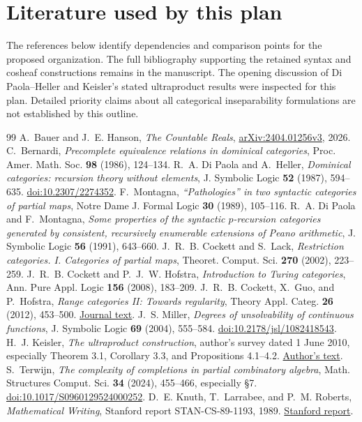 \documentclass[11pt]{article}
\theoremstyle{definition}\newtheorem{definition}[theorem]{Definition}
\begin{document}
\section*{Literature used by this plan}
The references below identify dependencies and comparison points for
the proposed organization. The full bibliography supporting the
retained syntax and cosheaf constructions remains in the manuscript.
The opening discussion of Di Paola--Heller and Keisler's stated
ultraproduct results were inspected for this plan. Detailed priority
claims about all categorical inseparability formulations are not
established by this outline.
\begin{thebibliography}{99}\small
{} A.~Bauer and J.~E. Hanson, \emph{The Countable Reals}, \href{https://arxiv.org/abs/2404.01256v3}{arXiv:2404.01256v3}, 2026.
 C.~Bernardi, \emph{Precomplete equivalence relations in dominical categories}, Proc. Amer. Math. Soc. \textbf{98} (1986), 124--134.
 R.~A. Di Paola and A.~Heller, \emph{Dominical categories: recursion theory without elements}, J. Symbolic Logic \textbf{52} (1987), 594--635. \href{https://doi.org/10.2307/2274352}{doi:10.2307/2274352}.
 F.~Montagna, \emph{``Pathologies'' in two syntactic categories of partial maps}, Notre Dame J. Formal Logic \textbf{30} (1989), 105--116.
 R.~A. Di Paola and F.~Montagna, \emph{Some properties of the syntactic $p$-recursion categories generated by consistent, recursively enumerable extensions of Peano arithmetic}, J. Symbolic Logic \textbf{56} (1991), 643--660.
 J.~R.~B. Cockett and S.~Lack, \emph{Restriction categories. I. Categories of partial maps}, Theoret. Comput. Sci. \textbf{270} (2002), 223--259.
 J.~R.~B. Cockett and P.~J.~W. Hofstra, \emph{Introduction to Turing categories}, Ann. Pure Appl. Logic \textbf{156} (2008), 183--209.
 J.~R.~B. Cockett, X.~Guo, and P.~Hofstra, \emph{Range categories II: Towards regularity}, Theory Appl. Categ. \textbf{26} (2012), 453--500. \href{https://www.tac.mta.ca/tac/volumes/26/18/26-18abs.html}{Journal text}.
 J.~S. Miller, \emph{Degrees of unsolvability of continuous functions}, J. Symbolic Logic \textbf{69} (2004), 555--584. \href{https://doi.org/10.2178/jsl/1082418543}{doi:10.2178/jsl/1082418543}.
 H.~J. Keisler, \emph{The ultraproduct construction}, author's survey dated 1 June 2010, especially Theorem 3.1, Corollary 3.3, and Propositions 4.1--4.2. \href{https://people.math.wisc.edu/~hkeisler/ultraproducts-web-final.pdf}{Author's text}.
 S.~Terwijn, \emph{The complexity of completions in partial combinatory algebra}, Math. Structures Comput. Sci. \textbf{34} (2024), 455--466, especially \S7. \href{https://doi.org/10.1017/S0960129524000252}{doi:10.1017/S0960129524000252}.
 D.~E. Knuth, T.~Larrabee, and P.~M. Roberts, \emph{Mathematical Writing}, Stanford report STAN-CS-89-1193, 1989. \href{https://www-cs-faculty.stanford.edu/~knuth/papers/cs1193.pdf}{Stanford report}.
\end{thebibliography}
\end{document}
